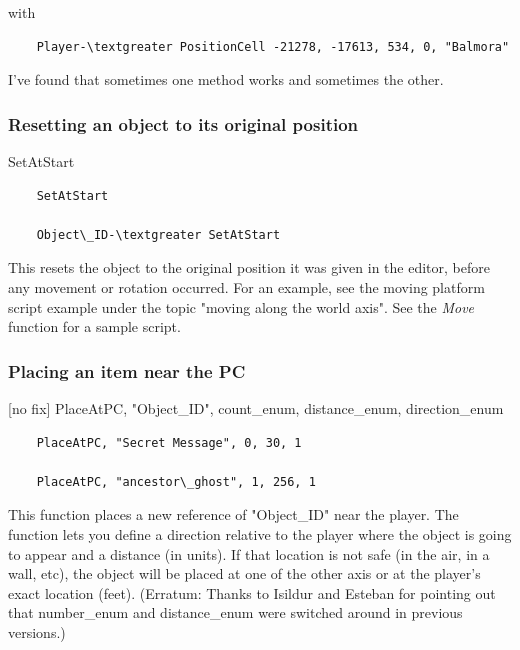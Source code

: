 with

\begin{lstlisting}
	Player-\textgreater PositionCell -21278, -17613, 534, 0, "Balmora"
\end{lstlisting}

I've found that sometimes one method works and sometimes the other.

\hypertarget{resetting-an-object-to-its-original-position}{%
\subsubsection{Resetting an object to its original
position}\label{resetting-an-object-to-its-original-position}}

SetAtStart

\begin{lstlisting}
	SetAtStart
	
	Object\_ID-\textgreater SetAtStart
\end{lstlisting}

This resets the object to the original position it was given in the
editor, before any movement or rotation occurred. For an example, see
the moving platform script example under the topic "moving along the
world axis". See the \emph{Move} function for a sample script.

\hypertarget{placing-an-item-near-the-pc}{%
\subsubsection{Placing an item near the
PC}\label{placing-an-item-near-the-pc}}

{[}no fix{]} PlaceAtPC, "Object\_ID", count\_enum, distance\_enum,
direction\_enum

\begin{lstlisting}
	PlaceAtPC, "Secret Message", 0, 30, 1
	
	PlaceAtPC, "ancestor\_ghost", 1, 256, 1
\end{lstlisting}

This function places a new reference of "Object\_ID" near the player.
The function lets you define a direction relative to the player where
the object is going to appear and a distance (in units). If that
location is not safe (in the air, in a wall, etc), the object will be
placed at one of the other axis or at the player's exact location
(feet). (Erratum: Thanks to Isildur and Esteban for pointing out that
number\_enum and distance\_enum were switched around in previous
versions.)

